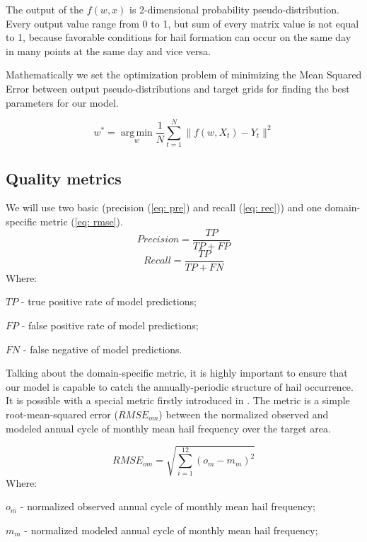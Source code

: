 \documentclass[conference]{IEEEtran}
\DeclareMathOperator*{\argmin}{arg\,min}
\begin{document}
The output of the $f(w, x)$ is 2-dimensional probability pseudo-distribution. Every output value range from 0 to 1, but sum of every matrix value is not equal to 1, because favorable conditions for hail formation can occur on the same day in many points at the same day and vice versa.

Mathematically we set the optimization problem of minimizing the Mean Squared Error between output pseudo-distributions and target grids for finding the best parameters for our model.

\begin{equation}
    w^* = \argmin\limits_w\frac{1}{N}\sum\limits_{t = 1 }^{N}\|f(w, X_t) - Y_t\|^2
\end{equation}

\subsection{Quality metrics}
We will use two basic (precision (\ref{eq: pre}) and recall (\ref{eq: rec})) and one domain-specific metric (\ref{eq: rmse}).
\begin{equation}
 Precision = \frac{TP}{TP+FP} 
 \label{eq: pre}
\end{equation}
\begin{equation}
 Recall = \frac{TP}{TP+FN}
 \label{eq: rec}
\end{equation}
Where:

$TP$ - true positive rate of model predictions;

$FP$ - false positive rate of model predictions;

$FN$ - false negative of model predictions.

Talking about the domain-specific metric, it is highly important to ensure that our model is capable to catch the annually-periodic structure of hail occurrence. It is possible with a special metric firstly introduced in \cite{PREIN201810}. The metric is a simple root-mean-squared error ($RMSE_{om}$) between the normalized observed and modeled annual cycle of monthly mean hail frequency over the target area.

\begin{equation}
    RMSE_{om} = \sqrt{\sum_{i=1}^{12}(o_{m}-m_{m})^2}
 \label{eq: rmse}
\end{equation}
Where:

$o_{m}$ - normalized observed annual cycle of monthly mean hail frequency;

$m_{m}$ - normalized modeled annual cycle of monthly mean hail frequency;
\end{document}
